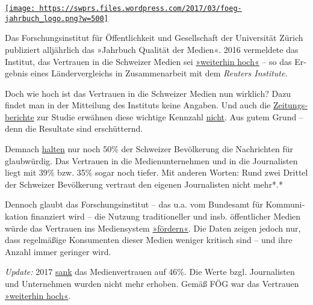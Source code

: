 \href{https://swprs.org/2017/03/01/schweizer-medien-vertrauen/}{\texttt{[image: https://swprs.files.wordpress.com/2017/03/foeg-jahrbuch\_logo.png?w=500]}}

Das Forschungs­institut für Öf­fent­lich­­keit und Gesell­schaft der
Uni­ver­sität Zürich publi­ziert all­jähr­lich das »Jahr­buch Qualität
der Medien«. 2016 ver­mel­dete das In­sti­tut, das Ver­trau­en in die
Schwei­zer Me­dien sei
\href{http://www.foeg.uzh.ch/dam/jcr:7234c6d3-1f09-4d36-b6ab-f14e659d046e/Medienmitteilung_JB_2016_dt.pdf}{»weiter­hin
hoch«} -- so das Er­geb­nis eines Länder­ver­gleichs in
Zu­sam­men­ar­beit mit dem \emph{\emph{Reu­ters Insti­tute.}}

Doch wie hoch ist das Vertrauen in die Schweizer Medien nun wirklich?
Dazu findet man in der Mit­tei­lung des Instituts keine An­ga­ben. Und
auch die
\href{http://www.tagesanzeiger.ch/schweiz/standard/Diese-Menschen-sind-anfaellig-fuer-Populisten/story/23804017}{Zei­tungs­be­richte}
zur Studie er­wäh­nen diese wich­tige Kenn­zahl
\href{http://www.nzz.ch/schweiz/analyse-zum-medienvertrauen-oeffentliche-medien-staerken-auch-die-privaten-ld.128965}{nicht}.
Aus gutem Grund -- denn die Resultate sind er­schüt­ternd.

Demnach
\href{http://media.digitalnewsreport.org/wp-content/uploads/2018/11/Digital-News-Report-2016.pdf\#page=60}{halten}
nur noch 50\% der Schwei­zer Be­völ­ke­rung die Nach­rich­ten für
glaub­würdig. Das Ver­trauen in die Medien­unter­nehmen und in die
Jour­na­listen liegt mit 39\% bzw. 35\% sogar noch tiefer. Mit anderen
Worten: Rund zwei Drittel der Schweizer Be­völ­ke­rung ver­traut den
ei­ge­nen Jour­na­listen nicht mehr*.*

Dennoch glaubt das For­schungs­in­sti­tut -- das u.a. vom Bundes­amt für
Kom­mu­ni­ka­tion finanziert wird -- die Nutzung tra­di­tio­neller und
ins­b. öffent­licher Medien würde das Ver­trauen ins Medien­system
\href{http://www.foeg.uzh.ch/dam/jcr:7234c6d3-1f09-4d36-b6ab-f14e659d046e/Medienmitteilung_JB_2016_dt.pdf}{»för­dern«}.
Die Da­ten zei­gen je­doch nur, dass regel­mäßige Kon­su­menten die­ser
Me­dien we­ni­ger kri­tisch sind -- und ihre An­zahl immer ge­ringer
wird.

\emph{Update:} 2017
\href{http://www.digitalnewsreport.org/survey/2017/switzerland-2017/}{sank}
das Medienvertrauen auf 46\%. Die Werte bzgl. Journalisten und
Unter­neh­men wurden nicht mehr erhoben. Gemäß FÖG war das Vertrauen
\href{http://www.foeg.uzh.ch/dam/jcr:0d0e5a10-27be-4e97-b264-b2cf7de96bbd/Broschur_Jahrbuch_foeg_deutsch_2017_ohne_Sperrvermerk.pdf}{»weiterhin
hoch«}.


